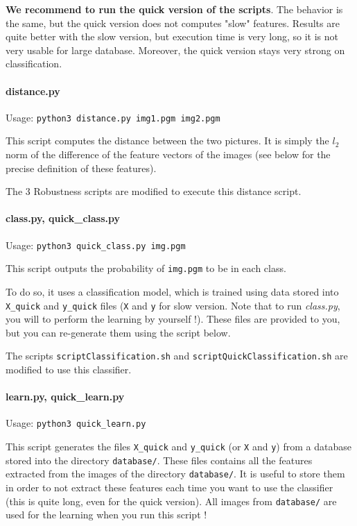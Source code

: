 \documentclass[12pt]{article}
\begin{document}
\textbf{We recommend to run the quick version of the scripts}. The behavior is the same, but the quick version does not computes "slow" features. Results are quite better with the slow version, but execution time is very long, so it is not very usable for large database. Moreover, the quick version stays very strong on classification.

\paragraph{distance.py} Usage: \texttt{python3 distance.py img1.pgm img2.pgm}

This script computes the distance between the two pictures. It is simply the $l_2$ norm of the difference of the feature vectors of the images (see below for the precise definition of these features).

The 3 Robustness scripts are modified to execute this distance script.

\paragraph{class.py, quick\_class.py}
Usage: \texttt{python3 quick\_class.py img.pgm}

This script outputs the probability of \texttt{img.pgm} to be in each class. 

To do so, it uses a classification model, which is trained using data stored into \texttt{X\_quick} and \texttt{y\_quick} files (\texttt{X} and \texttt{y} for slow version. 
Note that to run \textit{class.py}, you will to perform the learning by yourself !). These files are provided to you, but you can re-generate them using the script below.

The scripts \texttt{scriptClassification.sh} and \texttt{scriptQuickClassification.sh} are modified to use this classifier.

\paragraph{learn.py, quick\_learn.py}
Usage: \texttt{python3 quick\_learn.py}

This script generates the files \texttt{X\_quick} and \texttt{y\_quick} (or \texttt{X} and \texttt{y}) from a database stored into the directory \texttt{database/}.
These files contains all the features extracted from the images of the directory \texttt{database/}. It is useful to store them in order to not extract these features each time you want to use the classifier (this is quite long, even for the quick version).
All images from \texttt{database/} are used for the learning when you run this script !
\end{document}
